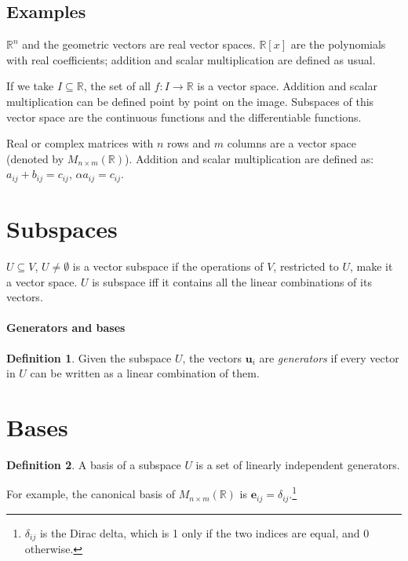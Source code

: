 \documentclass[12pt,a4paper]{report}
\numberwithin{equation}{section}
\theoremstyle{definition}
\newtheorem{definition}{Definition}[section]
\theoremstyle{remark}
\begin{document}
\subsection{Examples}

$\mathbb{R}^n$ and the geometric vectors are real vector spaces. $\mathbb{R}[x]$ are the polynomials with real coefficients; addition and scalar multiplication are defined as usual.

If we take $I \subseteq \mathbb{R}$, the set of all $f: I \rightarrow \mathbb{R}$ is a vector space. Addition and scalar multiplication can be defined point by point on the image. Subspaces of this vector space are the continuous functions and the differentiable functions.

Real or complex matrices with $n$ rows and $m$ columns are a vector space (denoted by $M_{n\times m} (\mathbb{R})$). Addition and scalar multiplication are defined as: $a_{ij} + b_{ij} = c_{ij}$, $\alpha a_{ij} = c_{ij}$.

\section{Subspaces}

$U\subseteq V$, $U\neq \emptyset$ is a vector subspace if the operations of $V$, restricted to $U$, make it a vector space. $U$ is subspace iff it contains all the linear combinations of its vectors.

\paragraph{Generators and bases}

\begin{definition}
Given the subspace $U$, the vectors $\mathbf{u}_i$ are \emph{generators} if every vector in $U$ can be written as a linear combination of them.
\end{definition}

\section{Bases}

\begin{definition}
A basis of a subspace $U$ is a set of linearly independent generators.
\end{definition}

For example, the canonical basis of $M_{n\times m} (\mathbb{R})$ is $\mathbf{e}_{ij} = \delta_{ij}$.\footnote{$\delta_{ij}$ is the Dirac delta, which is 1 only if the two indices are equal, and 0 otherwise.}
\end{document}
